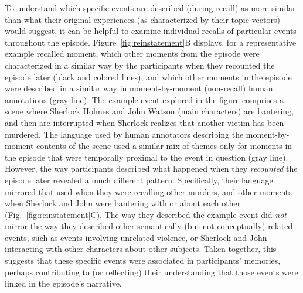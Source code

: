 \documentclass{article}
\begin{document}
To understand which specific events are described (during recall) as more similar than what their original experiences (as characterized by their topic vectors) would suggest, it can be helpful to examine individual recalls of particular events throughout the episode.  Figure~\ref{fig:reinstatement}B displays, for a representative example recalled moment, which other moments from the episode were characterized in a similar way by the participants when they recounted the episode later (black and colored lines), and which other moments in the episode were described in a similar way in moment-by-moment (non-recall) human annotations (gray line).  The example event explored in the figure comprises a scene where Sherlock Holmes and John Watson (main characters) are bantering, and then are interrupted when Sherlock realizes that another victim has been murdered.  The language used by human annotators describing the moment-by-moment contents of the scene used a similar mix of themes only for moments in the episode that were temporally proximal to the event in question (gray line).  However, the way participants described what happened when they \textit{recounted} the episode later revealed a much different pattern.  Specifically, their language mirrored that used when they were recalling other murders, and other moments when Sherlock and John were bantering with or about each other (Fig.~\ref{fig:reinstatement}C).  The way they described the example event did \textit{not} mirror the way they described other semantically (but not conceptually) related events, such as events involving unrelated violence, or Sherlock and John interacting with other characters about other subjects.  Taken together, this suggests that these specific events were associated in participants' memories, perhaps contributing to (or reflecting) their understanding that those events were linked in the episode's narrative.
\end{document}
